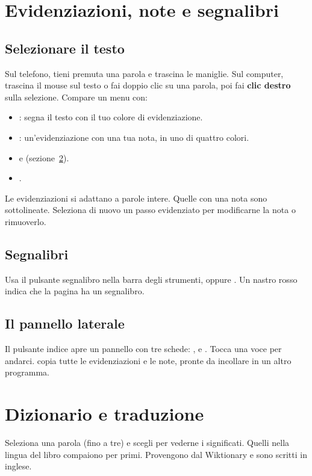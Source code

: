 \documentclass[11pt]{article}
\begin{document}
\section{Evidenziazioni, note e segnalibri}

\subsection{Selezionare il testo}
Sul telefono, tieni premuta una parola e trascina le maniglie. Sul computer, trascina il mouse sul
testo o fai doppio clic su una parola, poi fai \textbf{clic destro} sulla selezione. Compare un
menu con:
\begin{itemize}
  \item {}: segna il testo con il tuo colore di evidenziazione.
  \item {}: un’evidenziazione con una tua nota, in uno di quattro colori.
  \item {} e  (sezione~\ref{sec:lookup}).
  \item {}.
\end{itemize}
Le evidenziazioni si adattano a parole intere. Quelle con una nota sono sottolineate. Seleziona di
nuovo un passo evidenziato per modificarne la nota o rimuoverlo.

\subsection{Segnalibri}
Usa il pulsante segnalibro nella barra degli strumenti, oppure . Un nastro rosso
indica che la pagina ha un segnalibro.

\subsection{Il pannello laterale}
Il pulsante indice apre un pannello con tre schede: ,  e .
Tocca una voce per andarci.  copia tutte le evidenziazioni e le note,
pronte da incollare in un altro programma.

\section{Dizionario e traduzione}\label{sec:lookup}

Seleziona una parola (fino a tre) e scegli  per vederne i significati. Quelli nella
lingua del libro compaiono per primi. Provengono dal Wiktionary e sono scritti in inglese.
\end{document}
